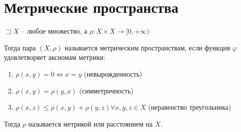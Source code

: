 \documentclass{book}
\renewcommand\phi{\varphi}
\theoremstyle{definition}
\begin{document}
    \section{Метрические пространства}
    \begin{definition}
        $\sqsupset X$ -- любое множество, а $\rho: X\times X \to [0,+\infty )$

        Тогда пара $(X, \rho)$ называется метрическим пространствам, если функция $\phi$ удовлетворяет аксиомам метрики:
        \begin{enumerate}
            \item $\rho(x,y) = 0 \iff x = y$ (невырожденность)
            \item $\rho(x,y) = \rho(y,x)$ (симметричность)
            \item $\rho(x,z) \leqslant \rho(x,y) + \rho(y,z) \forall x, y, z\in X$ (неравенство треугольника)
        \end{enumerate}

        Тогда $\rho$ называется метрикой или расстоянием на $X$.
    \end{definition}
\end{document}
